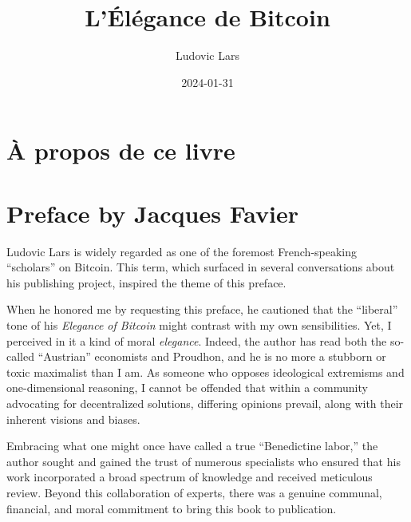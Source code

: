 \documentclass[
  a5paper,
  smalldemyvopaper,10pt,twoside,onecolumn,openright,extrafontsizes,hidelinks]{memoir}
\title{L'Élégance de Bitcoin}
\author{Ludovic Lars}
\date{2024-01-31}
\renewcommand*\contentsname{Table of contents}
\newcommand\contentsname{Table of contents}
\begin{document}
\frontmatter
\maketitle

\renewcommand*\contentsname{Contents}
{
\setcounter{tocdepth}{0}
\tableofcontents
}

\mainmatter
{}

\chapter*{À propos de ce livre}\label{uxe0-propos-de-ce-livre}



\chapter*{Preface by Jacques Favier}\label{pruxe9face-de-jacques-favier}


Ludovic Lars is widely regarded as one of the foremost French-speaking
``scholars'' on Bitcoin. This term, which surfaced in several
conversations about his publishing project, inspired the theme of this
preface.

When he honored me by requesting this preface, he cautioned that the
``liberal'' tone of his \emph{Elegance of Bitcoin} might contrast with
my own sensibilities. Yet, I perceived in it a kind of moral
\emph{elegance}. Indeed, the author has read both the so-called
``Austrian'' economists and Proudhon, and he is no more a stubborn or
toxic maximalist than I am. As someone who opposes ideological
extremisms and one-dimensional reasoning, I cannot be offended that
within a community advocating for decentralized solutions, differing
opinions prevail, along with their inherent visions and biases.

Embracing what one might once have called a true ``Benedictine labor,''
the author sought and gained the trust of numerous specialists who
ensured that his work incorporated a broad spectrum of knowledge and
received meticulous review. Beyond this collaboration of experts, there
was a genuine communal, financial, and moral commitment to bring this
book to publication.
\end{document}
